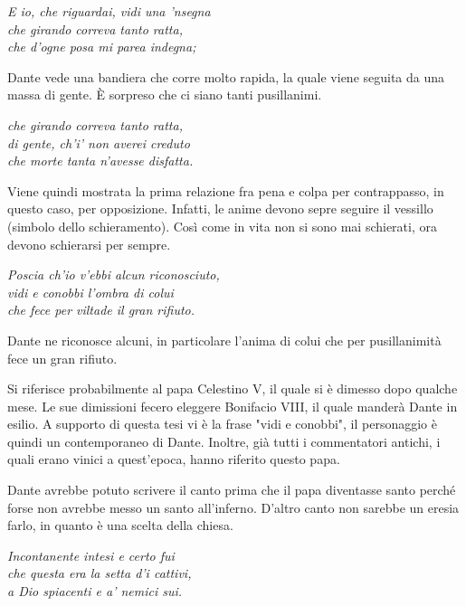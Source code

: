 \documentclass[a4paper]{article}
\begin{document}
\begin{center}
    \textit{E io, che riguardai, vidi una 'nsegna} \\
    \textit{che girando correva tanto ratta,} \\
    \textit{che d'ogne posa mi parea indegna;}
\end{center}

Dante vede una bandiera che corre molto rapida, la quale viene seguita
da una massa di gente. È sorpreso che ci siano tanti pusillanimi.

\begin{center}
    \textit{che girando correva tanto ratta,} \\
    \textit{di gente, ch'i' non averei creduto} \\
    \textit{che morte tanta n'avesse disfatta.}
\end{center}

Viene quindi mostrata la prima relazione fra pena e colpa per contrappasso,
in questo caso, per opposizione. Infatti, le anime devono sepre seguire il vessillo (simbolo dello schieramento).
Così come in vita non si sono mai schierati, ora devono schierarsi per sempre.

\begin{center}
    \textit{Poscia ch'io v'ebbi alcun riconosciuto,} \\
    \textit{vidi e conobbi l'ombra di colui} \\
    \textit{che fece per viltade il gran rifiuto.}
\end{center}

Dante ne riconosce alcuni, in particolare l'anima di colui
che per pusillanimità fece un gran rifiuto.

Si riferisce probabilmente al papa Celestino V, il quale si è dimesso
dopo qualche mese. Le sue dimissioni fecero eleggere Bonifacio VIII, il quale manderà Dante in esilio.
A supporto di questa tesi vi è la frase "vidi e conobbi", il personaggio è quindi un contemporaneo
di Dante. Inoltre, già tutti i commentatori antichi, i quali erano vinici a quest'epoca,
hanno riferito questo papa.

Dante avrebbe potuto scrivere il canto prima che il papa diventasse santo
perché forse non avrebbe messo un santo all'inferno.
D'altro canto non sarebbe un eresia farlo, in quanto è una scelta della chiesa.

\begin{center}
    \textit{Incontanente intesi e certo fui} \\
    \textit{che questa era la setta d'i cattivi,} \\
    \textit{a Dio spiacenti e a' nemici sui.}
\end{center}
\end{document}
